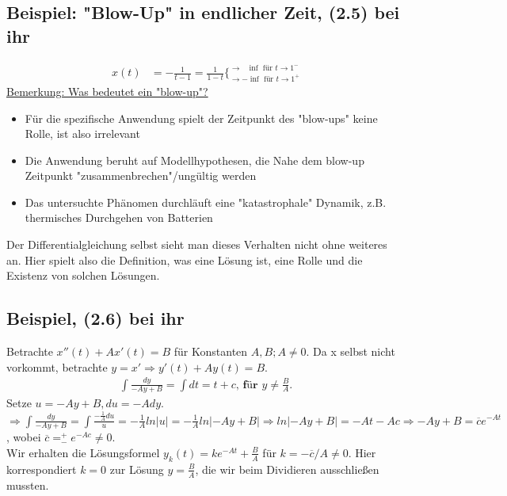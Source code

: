 \documentclass[12pt,a4paper]{article}
\newcommand{\DGL}{Differentialgleichung }
\begin{document}
\subsection{Beispiel: "Blow-Up" in endlicher Zeit, (2.5) bei ihr}
\begin{align*}
x(t) &= - \frac{1}{t-1} = \frac{1}{1-t} \{^{\rightarrow \text{ } \inf \text{ für } t \rightarrow 1^-}_{\rightarrow -\inf \text{ für } t \rightarrow 1^+}
\end{align*}
\underline{Bemerkung: Was bedeutet ein "blow-up"?}
\begin{itemize}
\item Für die spezifische Anwendung spielt der Zeitpunkt des "blow-ups" keine Rolle, ist also irrelevant
\item Die Anwendung beruht auf Modellhypothesen, die Nahe dem blow-up Zeitpunkt "zusammenbrechen"/ungültig werden
\item Das untersuchte Phänomen durchläuft eine "katastrophale" Dynamik, z.B. thermisches Durchgehen von Batterien
\end{itemize}
Der \DGL selbst sieht man dieses Verhalten nicht ohne weiteres an. Hier spielt also die Definition, was eine Lösung ist, eine Rolle und die Existenz von solchen Lösungen.
\subsection{Beispiel, (2.6) bei ihr}
Betrachte $x''(t) + Ax'(t) = B$ für Konstanten $A,B; A \neq 0$. Da x selbst nicht vorkommt, betrachte $y=x' \Rightarrow y'(t) + Ay(t) = B$.
\begin{align*}
\int \frac{dy}{-Ay+B} = \int dt = t+c \textbf{, für } y \neq \frac{B}{A}.
\end{align*}
Setze $u=-Ay+B, du=-Ady$.
$\Rightarrow \int \frac{dy}{-Ay+B} = \int \frac{-\frac{1}{A}du}{u} = -\frac{1}{A} ln|u| = -\frac{1}{A} ln|-Ay+B| \Rightarrow ln|-Ay+B| = -At-Ac \Rightarrow -Ay+B=\overline{c}e^{-At}$, wobei $\overline{c} = ^+_- e^{-Ac} \neq 0$. \\
Wir erhalten die Lösungsformel $y_k(t) = ke^{-At} + \frac{B}{A}$ für $k=-\overline{c}/A \neq 0$. Hier korrespondiert $k=0$ zur Lösung $y=\frac{B}{A}$, die wir beim Dividieren ausschließen mussten. \\
\end{document}
